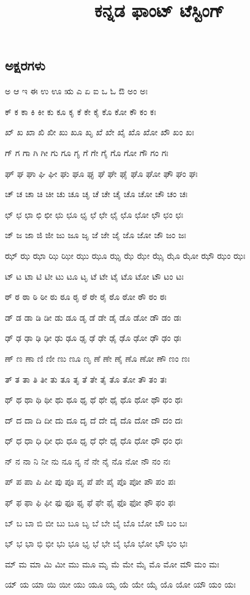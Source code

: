 \documentclass[10pt,oneside]{book}
\title{ಕನ್ನಡ ಫಾಂಟ್ ಟೆಸ್ಟಿಂಗ್}
\date{}
\author{}
\begin{document}
\maketitle{}
\begin{spacing}{1.6}
  \chapter*{ಅಕ್ಷರಗಳು}
  \LARGE
ಅ ಆ ಇ ಈ ಉ ಊ ಋ ಎ ಏ ಐ ಒ ಓ ಔ ಅಂ ಅಃ

ಕ್ ಕ ಕಾ ಕಿ ಕೀ ಕು ಕೂ ಕೃ ಕೆ ಕೇ ಕೈ ಕೊ ಕೋ ಕೌ ಕಂ ಕಃ

ಖ್ ಖ ಖಾ ಖಿ ಖೀ ಖು ಖೂ ಖೃ ಖೆ ಖೇ ಖೈ ಖೊ ಖೋ ಖೌ ಖಂ ಖಃ

ಗ್ ಗ ಗಾ ಗಿ ಗೀ ಗು ಗೂ ಗೃ ಗೆ ಗೇ ಗೈ ಗೊ ಗೋ ಗೌ ಗಂ ಗಃ

ಘ್ ಘ ಘಾ ಘಿ ಘೀ ಘು ಘೂ ಘೃ ಘೆ ಘೇ ಘೈ ಘೊ ಘೋ ಘೌ ಘಂ ಘಃ

ಚ್ ಚ ಚಾ ಚಿ ಚೀ ಚು ಚೂ ಚೃ ಚೆ ಚೇ ಚೈ ಚೊ ಚೋ ಚೌ ಚಂ ಚಃ

ಛ್ ಛ ಛಾ ಛಿ ಛೀ ಛು ಛೂ ಛೃ ಛೆ ಛೇ ಛೈ ಛೊ ಛೋ ಛೌ ಛಂ ಛಃ

ಜ್ ಜ ಜಾ ಜಿ ಜೀ ಜು ಜೂ ಜೃ ಜೆ ಜೇ ಜೈ ಜೊ ಜೋ ಜೌ ಜಂ ಜಃ

ಝ್ ಝ ಝಾ ಝಿ ಝೀ ಝು ಝೂ ಝೃ ಝೆ ಝೇ ಝೈ ಝೊ ಝೋ ಝೌ ಝಂ ಝಃ

ಟ್ ಟ ಟಾ ಟಿ ಟೀ ಟು ಟೂ ಟೃ ಟೆ ಟೇ ಟೈ ಟೊ ಟೋ ಟೌ ಟಂ ಟಃ

ಠ್ ಠ ಠಾ ಠಿ ಠೀ ಠು ಠೂ ಠೃ ಠೆ ಠೇ ಠೈ ಠೊ ಠೋ ಠೌ ಠಂ ಠಃ

ಡ್ ಡ ಡಾ ಡಿ ಡೀ ಡು ಡೂ ಡೃ ಡೆ ಡೇ ಡೈ ಡೊ ಡೋ ಡೌ ಡಂ ಡಃ

ಢ್ ಢ ಢಾ ಢಿ ಢೀ ಢು ಢೂ ಢೃ ಢೆ ಢೇ ಢೈ ಢೊ ಢೋ ಢೌ ಢಂ ಢಃ

ಣ್ ಣ ಣಾ ಣಿ ಣೀ ಣು ಣೂ ಣೃ ಣೆ ಣೇ ಣೈ ಣೊ ಣೋ ಣೌ ಣಂ ಣಃ

ತ್ ತ ತಾ ತಿ ತೀ ತು ತೂ ತೃ ತೆ ತೇ ತೈ ತೊ ತೋ ತೌ ತಂ ತಃ

ಥ್ ಥ ಥಾ ಥಿ ಥೀ ಥು ಥೂ ಥೃ ಥೆ ಥೇ ಥೈ ಥೊ ಥೋ ಥೌ ಥಂ ಥಃ

ದ್ ದ ದಾ ದಿ ದೀ ದು ದೂ ದೃ ದೆ ದೇ ದೈ ದೊ ದೋ ದೌ ದಂ ದಃ

ಧ್ ಧ ಧಾ ಧಿ ಧೀ ಧು ಧೂ ಧೃ ಧೆ ಧೇ ಧೈ ಧೊ ಧೋ ಧೌ ಧಂ ಧಃ

ನ್ ನ ನಾ ನಿ ನೀ ನು ನೂ ನೃ ನೆ ನೇ ನೈ ನೊ ನೋ ನೌ ನಂ ನಃ

ಪ್ ಪ ಪಾ ಪಿ ಪೀ ಪು ಪೂ ಪೃ ಪೆ ಪೇ ಪೈ ಪೊ ಪೋ ಪೌ ಪಂ ಪಃ

ಫ್ ಫ ಫಾ ಫಿ ಫೀ ಫು ಫೂ ಫೃ ಫೆ ಫೇ ಫೈ ಫೊ ಫೋ ಫೌ ಫಂ ಫಃ

ಬ್ ಬ ಬಾ ಬಿ ಬೀ ಬು ಬೂ ಬೃ ಬೆ ಬೇ ಬೈ ಬೊ ಬೋ ಬೌ ಬಂ ಬಃ

ಭ್ ಭ ಭಾ ಭಿ ಭೀ ಭು ಭೂ ಭೃ ಭೆ ಭೇ ಬೈ ಭೊ ಭೋ ಭೌ ಭಂ ಭಃ

ಮ್ ಮ ಮಾ ಮಿ ಮೀ ಮು ಮೂ ಮೃ ಮೆ ಮೇ ಮೈ ಮೊ ಮೋ ಮೌ ಮಂ ಮಃ

ಯ್ ಯ ಯಾ ಯಿ ಯೀ ಯು ಯೂ ಯೃ ಯೆ ಯೇ ಯೈ ಯೊ ಯೋ ಯೌ ಯಂ ಯಃ


\end{spacing}
\end{document}
